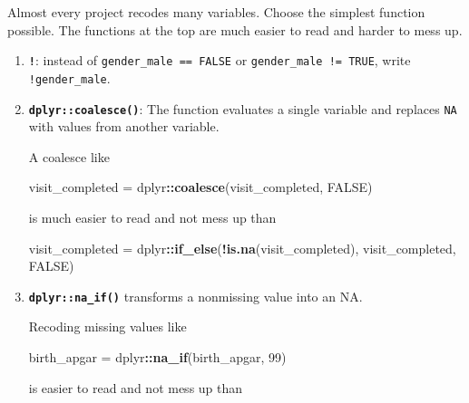\documentclass[
]{book}
\newenvironment{Shaded}{\begin{snugshade}}{\end{snugshade}}
\newcommand{\DecValTok}[1]{\textcolor[rgb]{0.00,0.00,0.81}{#1}}
\newcommand{\KeywordTok}[1]{\textcolor[rgb]{0.13,0.29,0.53}{\textbf{#1}}}
\newcommand{\NormalTok}[1]{#1}
\newcommand{\OperatorTok}[1]{\textcolor[rgb]{0.81,0.36,0.00}{\textbf{#1}}}
\newcommand{\OtherTok}[1]{\textcolor[rgb]{0.56,0.35,0.01}{#1}}
\newcommand{\StringTok}[1]{\textcolor[rgb]{0.31,0.60,0.02}{#1}}
\begin{document}
Almost every project recodes many variables. Choose the simplest function possible. The functions at the top are much easier to read and harder to mess up.

\begin{enumerate}
\def\labelenumi{\arabic{enumi}.}
\item
  \textbf{\texttt{!}}: instead of \texttt{gender\_male\ ==\ FALSE} or \texttt{gender\_male\ !=\ TRUE}, write \texttt{!gender\_male}.
\item
  \textbf{\texttt{dplyr::coalesce()}}: The function evaluates a single variable and replaces \texttt{NA} with values from another variable.

  A coalesce like

\begin{Shaded}
\begin{Highlighting}[]
\NormalTok{visit\_completed =}\StringTok{ }\NormalTok{dplyr}\OperatorTok{::}\KeywordTok{coalesce}\NormalTok{(visit\_completed, }\OtherTok{FALSE}\NormalTok{)}
\end{Highlighting}
\end{Shaded}

  is much easier to read and not mess up than

\begin{Shaded}
\begin{Highlighting}[]
\NormalTok{visit\_completed =}\StringTok{ }\NormalTok{dplyr}\OperatorTok{::}\KeywordTok{if\_else}\NormalTok{(}\OperatorTok{!}\KeywordTok{is.na}\NormalTok{(visit\_completed), visit\_completed, }\OtherTok{FALSE}\NormalTok{)}
\end{Highlighting}
\end{Shaded}
\item
  \textbf{\texttt{dplyr::na\_if()}} transforms a nonmissing value into an NA.

  Recoding missing values like

\begin{Shaded}
\begin{Highlighting}[]
\NormalTok{birth\_apgar =}\StringTok{ }\NormalTok{dplyr}\OperatorTok{::}\KeywordTok{na\_if}\NormalTok{(birth\_apgar, }\DecValTok{99}\NormalTok{)}
\end{Highlighting}
\end{Shaded}

  is easier to read and not mess up than


\end{enumerate}
\end{document}
